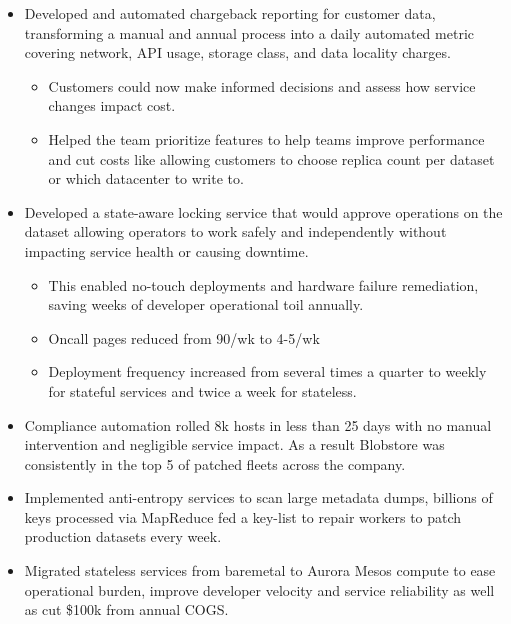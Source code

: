 \begin{mdframed}[linewidth=2,linecolor=blue, innertopmargin=1em, innerbottommargin=1em, topline=false, rightline=false, bottomline=false]
     \begin{itemize}
        \itemsep -5pt {} 
         \item Developed and automated chargeback reporting for customer data, transforming a manual and annual process into a daily automated metric covering network, API usage, storage class, and data locality charges. 
         \begin{itemize}
            \item Customers could now make informed decisions and assess how service changes impact cost.
            \item Helped the team prioritize features to help teams improve performance and cut costs like allowing customers to choose replica count per dataset or which datacenter to write to. 
         \end{itemize}
         \item Developed a state-aware locking service that would approve operations on the dataset allowing operators to work safely and independently without impacting service health or causing downtime. 
         \begin{itemize}
            \item This enabled no-touch deployments and hardware failure remediation, saving weeks of developer operational toil annually.
            \item Oncall pages reduced from 90/wk to 4-5/wk
            \item Deployment frequency increased from several times a quarter to weekly for stateful services and twice a week for stateless.
         \end{itemize}
         \item Compliance automation rolled 8k hosts in less than 25 days with no manual intervention and negligible service impact. As a result Blobstore was consistently in the top 5 of patched fleets across the company. 
         \item Implemented anti-entropy services to scan large metadata dumps, billions of keys processed via MapReduce fed a key-list to repair workers to patch production datasets every week. 
         \item Migrated stateless services from baremetal to Aurora Mesos compute to ease operational burden, improve developer velocity and service reliability as well as cut \$100k from annual COGS.
     \end{itemize}
    \end{mdframed}
